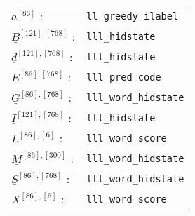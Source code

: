 \documentclass[12pt]{article}
\begin{document}
\begin{tabular}{ll}
$\underline{a}^{[86]}$ :&{\tt ll\_greedy\_ilabel}\\
$\underline{B}^{[121], [768]}$ :&{\tt lll\_hidstate}\\
$\underline{d}^{[121], [768]}$ :&{\tt lll\_hidstate}\\
$\underline{E}^{[86], [768]}$ :&{\tt lll\_pred\_code}\\
$\underline{G}^{[86], [768]}$ :&{\tt lll\_word\_hidstate}\\
$\underline{I}^{[121], [768]}$ :&{\tt lll\_hidstate}\\
$\underline{L}^{[86], [6]}$ :&{\tt lll\_word\_score}\\
$\underline{M}^{[86], [300]}$ :&{\tt lll\_word\_hidstate}\\
$\underline{S}^{[86], [768]}$ :&{\tt lll\_word\_hidstate}\\
$\underline{X}^{[86], [6]}$ :&{\tt lll\_word\_score}
\end{tabular}
\end{document}
